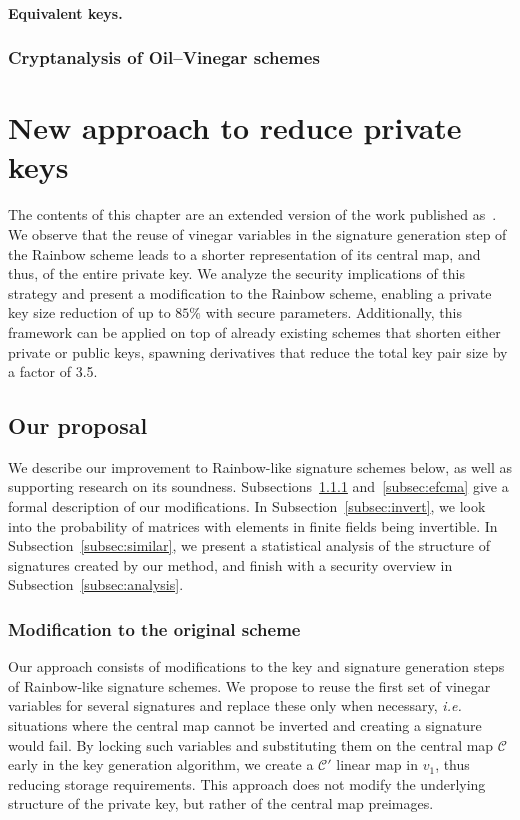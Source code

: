 \documentclass[draft, 12pt, a4paper, oneside]{memoir}
\theoremstyle{definition}
\begin{document}
\subsubsection{Equivalent keys.}

\subsection{Cryptanalysis of Oil--Vinegar schemes}\label{subsec:attacks}

\chapter{New approach to reduce private keys}\label{chapter:eta}

The contents of this chapter are an extended version of the work published as~\cite{Zambonin:201907}. We observe that the reuse of vinegar variables in the signature generation step of the Rainbow scheme leads to a shorter representation of its central map, and thus, of the entire private key. We analyze the security implications of this strategy and present a modification to the Rainbow scheme, enabling a private key size reduction of up to $85\%$ with secure parameters. Additionally, this framework can be applied on top of already existing schemes that shorten either private or public keys, spawning derivatives that reduce the total key pair size by a factor of 3.5.

\section{Our proposal}\label{sec:proposal}

We describe our improvement to Rainbow-like signature schemes below, as
well as supporting research on its soundness. Subsections~\ref{subsec:scheme}
and~\ref{subsec:efcma} give a formal description of our modifications. In
Subsection~\ref{subsec:invert}, we look into the probability of matrices with
elements in finite fields being invertible. In Subsection~\ref{subsec:similar},
we present a statistical analysis of the structure of signatures created by our
method, and finish with a security overview in
Subsection~\ref{subsec:analysis}.

\subsection{Modification to the original scheme}\label{subsec:scheme}

Our approach consists of modifications to the key and signature generation
steps of Rainbow-like signature schemes. We propose to reuse the first set of
vinegar variables for several signatures and replace these only when necessary,
\emph{i.e.} situations where the central map cannot be inverted and creating a
signature would fail. By locking such variables and substituting them on the
central map $\mathcal{C}$ early in the key generation algorithm, we create a
$\mathcal{C}'$ linear map in $v_{1}$, thus reducing storage requirements. This
approach does not modify the underlying structure of the private key, but
rather of the central map preimages.
\end{document}
